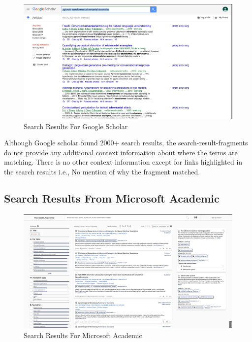 \begin{figure}[h]
    \centering
    \includegraphics[width=\maxwidth{\textwidth}]{src/images/google-scholar-example.png}
    \caption{Search Results For Google Scholar}
    \label{figure\arabic{figurecounter}}
\end{figure}
Although Google scholar found 2000+ search results, the search-result-fragments do not provide any additional context information about where the terms are matching.  There is no other context information except for links highlighted in the search results i.e., No mention of why the fragment matched. 

\pagebreak
\subsection{Search Results From Microsoft Academic}
\label{sr-m}
\begin{figure}[h]
    \centering
    \includegraphics[width=\maxwidth{\textwidth}]{src/images/academic-example.png}
    \caption{Search Results For Microsoft Academic}
    \label{figure\arabic{figurecounter}}
\end{figure}

